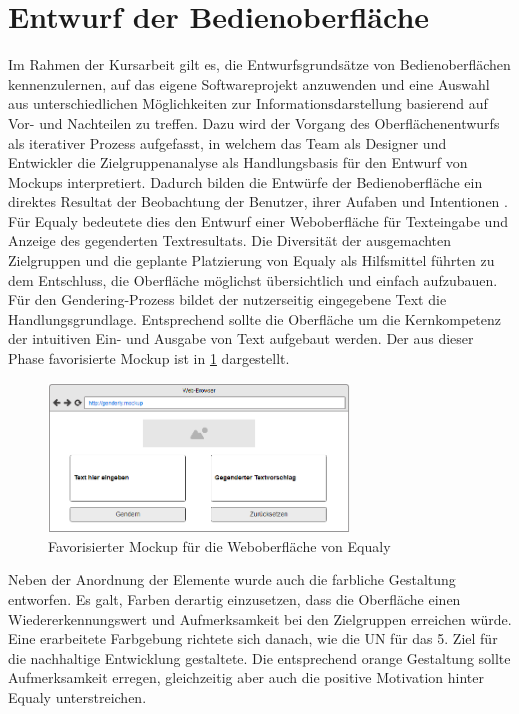 \section{Entwurf der Bedienoberfläche}
\label{sec:substitution}

Im Rahmen der Kursarbeit gilt es, die Entwurfsgrundsätze von Bedienoberflächen kennenzulernen, auf das eigene Softwareprojekt anzuwenden und eine Auswahl aus unterschiedlichen Möglichkeiten zur Informationsdarstellung basierend auf Vor- und Nachteilen zu treffen. Dazu wird der Vorgang des Oberflächenentwurfs als iterativer Prozess aufgefasst, in welchem das Team als Designer und Entwickler die Zielgruppenanalyse als Handlungsbasis für den Entwurf von Mockups interpretiert. Dadurch bilden die Entwürfe der Bedienoberfläche ein direktes Resultat der Beobachtung der Benutzer, ihrer Aufaben und Intentionen \cite{La05}. Für Equaly bedeutete dies den Entwurf einer Weboberfläche für Texteingabe und Anzeige des gegenderten Textresultats. Die Diversität der ausgemachten Zielgruppen und die geplante Platzierung von Equaly als Hilfsmittel führten zu dem Entschluss, die Oberfläche möglichst übersichtlich und einfach aufzubauen. Für den Gendering-Prozess bildet der nutzerseitig eingegebene Text die Handlungsgrundlage. Entsprechend sollte die Oberfläche um die Kernkompetenz der intuitiven Ein- und Ausgabe von Text aufgebaut werden. Der aus dieser Phase favorisierte Mockup ist in \ref{fig:mockup} dargestellt.

\begin{figure}[!th]
\centering
\includegraphics[width=8cm]{Resources/Mockup.PNG}
\caption{Favorisierter Mockup für die Weboberfläche von Equaly}
\label{fig:mockup}
\end{figure}

Neben der Anordnung der Elemente wurde auch die farbliche Gestaltung entworfen. Es galt, Farben derartig einzusetzen, dass die Oberfläche einen Wiedererkennungswert und Aufmerksamkeit bei den Zielgruppen erreichen würde. Eine erarbeitete Farbgebung richtete sich danach, wie die UN für das 5. Ziel für die nachhaltige Entwicklung gestaltete. Die entsprechend orange Gestaltung sollte Aufmerksamkeit erregen, gleichzeitig aber auch die positive Motivation hinter Equaly unterstreichen.
